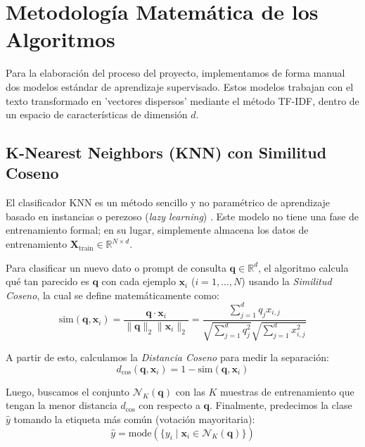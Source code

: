 \documentclass[twocolumn,10pt,journal]{IEEEtran}
\begin{document}
\section{Metodología Matemática de los Algoritmos}

Para la elaboración del proceso del proyecto, implementamos de forma manual dos modelos estándar de aprendizaje supervisado. Estos modelos trabajan con el texto transformado en 'vectores dispersos' mediante el método TF-IDF, dentro de un espacio de características de dimensión $d$.

\subsection{K-Nearest Neighbors (KNN) con Similitud Coseno}
El clasificador KNN es un método sencillo y no paramétrico de aprendizaje basado en instancias o perezoso (\textit{lazy learning}) \cite{hastie2009}. Este modelo no tiene una fase de entrenamiento formal; en su lugar, simplemente almacena los datos de entrenamiento $\mathbf{X}_{\text{train}} \in \mathbb{R}^{N \times d}$. 

Para clasificar un nuevo dato o prompt de consulta $\mathbf{q} \in \mathbb{R}^d$, el algoritmo calcula qué tan parecido es $\mathbf{q}$ con cada ejemplo $\mathbf{x}_i$ ($i = 1, \dots, N$) usando la \textit{Similitud Coseno}, la cual se define matemáticamente como:
\begin{equation}
\text{sim}(\mathbf{q}, \mathbf{x}_i) = \frac{\mathbf{q} \cdot \mathbf{x}_i}{\|\mathbf{q}\|_2 \|\mathbf{x}_i\|_2} = \frac{\sum_{j=1}^d q_j x_{i,j}}{\sqrt{\sum_{j=1}^d q_j^2} \sqrt{\sum_{j=1}^d x_{i,j}^2}}
\end{equation}

A partir de esto, calculamos la \textit{Distancia Coseno} para medir la separación:
\begin{equation}
d_{\text{cos}}(\mathbf{q}, \mathbf{x}_i) = 1 - \text{sim}(\mathbf{q}, \mathbf{x}_i)
\end{equation}

Luego, buscamos el conjunto $\mathcal{N}_K(\mathbf{q})$ con las $K$ muestras de entrenamiento que tengan la menor distancia $d_{\text{cos}}$ con respecto a $\mathbf{q}$. Finalmente, predecimos la clase $\hat{y}$ tomando la etiqueta más común (votación mayoritaria):
\begin{equation}
\hat{y} = \text{mode} \left( \{ y_i \mid \mathbf{x}_i \in \mathcal{N}_K(\mathbf{q}) \} \right)
\end{equation}
\end{document}
